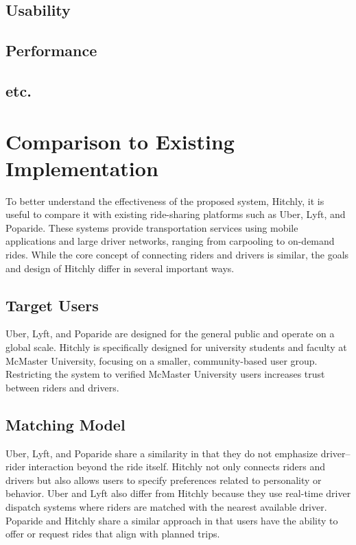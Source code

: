 \documentclass[12pt, titlepage]{article}
\begin{document}
\subsection{Usability}
		
\subsection{Performance}

\subsection{etc.}
	
\section{Comparison to Existing Implementation}

To better understand the effectiveness of the proposed system,
Hitchly, it is useful to compare it with existing ride-sharing
platforms such as Uber, Lyft, and Poparide. These systems provide
transportation services using mobile applications and large driver
networks, ranging from carpooling to on-demand rides. While the core
concept of connecting riders and drivers is similar, the goals and
design of Hitchly differ in several important ways.

\subsection{Target Users}

Uber, Lyft, and Poparide are designed for the general public and
operate on a global scale. Hitchly is specifically designed for
university students and faculty at McMaster University, focusing on
a smaller, community-based user group. Restricting the system to
verified McMaster University users increases trust between riders
and drivers.

\subsection{Matching Model}

Uber, Lyft, and Poparide share a similarity in that they do not
emphasize driver–rider interaction beyond the ride itself. Hitchly
not only connects riders and drivers but also allows users to specify
preferences related to personality or behavior. Uber and Lyft also
differ from Hitchly because they use real-time driver dispatch
systems where riders are matched with the nearest available driver.
Poparide and Hitchly share a similar approach in that users have the
ability to offer or request rides that align with planned trips.
\end{document}
